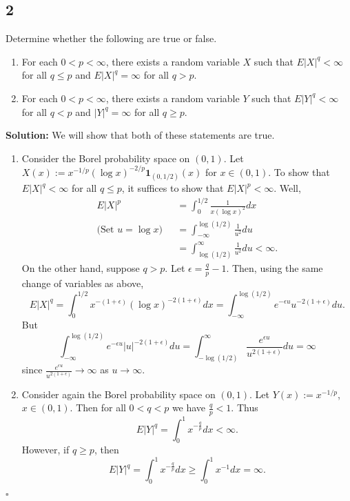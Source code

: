 \documentclass[12pt]{article}
\newcounter{ProofCounter}
\newenvironment{Solution}{\stepcounter{ProofCounter}\textbf{Solution:}}{\hfill$\square$}
\begin{document}
\subsection*{2}
\begin{tcolorbox}
  Determine whether the following are true or false.
  \begin{enumerate}
    \item For each $0 < p < \infty$, there exists a random variable $X$ such that $E|X|^{q} < \infty$ for all $q \leq p$ and $E|X|^{q} = \infty$ for all $q > p$.
    \item For each $0 < p < \infty$, there exists a random variable $Y$ such that $E|Y|^{q} < \infty$ for all $q < p$ and $|Y|^{q} = \infty$ for all $q \geq p$.
  \end{enumerate}
\end{tcolorbox}
\begin{Solution}
  We will show that both of these statements are true.

  \begin{enumerate}
    \item

      Consider the Borel probability space on $(0, 1)$. Let $X(x) := x^{-1/p} (\log x)^{-2/p} \bm{1}_{(0, 1/2)}(x)$ for $x \in (0, 1)$. To show that $E|X|^{q} < \infty$ for all $q \leq p$, it suffices to show that $E|X|^{p} < \infty$. Well,
      \begin{align*}
        E|X|^{p} & = \int_{0}^{1/2} \frac{1}{x(\log x)^2} dx \\
        \text{(Set $u = \log x$)}\ \ \ & = \int_{-\infty}^{\log (1/2)} \frac{1}{u^2} du \\
        & = \int_{\log(1/2)}^{\infty} \frac{1}{u^2} du < \infty.
      \end{align*}
      On the other hand, suppose $q > p$. Let $\epsilon = \frac{q}{p} - 1$. Then, using the same change of variables as above,
      \[
        E|X|^{q} = \int_{0}^{1/2} x^{-(1 + \epsilon)} (\log x)^{-2(1+\epsilon)} dx = \int_{-\infty}^{\log(1/2)} e^{-\epsilon u} u^{-2(1+\epsilon)} du.
      \]
      But
      \[
        \int_{-\infty}^{\log(1/2)} e^{-\epsilon u} |u|^{-2(1+\epsilon)} du = \int_{-\log(1/2)}^{\infty} \frac{e^{\epsilon u}}{u^{2(1 + \epsilon)}} du = \infty
      \]
      since $\frac{e^{\epsilon u}}{u^{2(1 + \epsilon)}} \rightarrow \infty$ as $u \rightarrow \infty$.

    \item

      Consider again the Borel probability space on $(0, 1)$. Let $Y(x) := x^{-1/p}$, $x \in (0, 1)$. Then for all $0 < q < p$ we have $\frac{q}{p} < 1$. Thus
      \[
        E|Y|^{q} = \int_{0}^{1} x^{-\frac{q}{p}}dx < \infty.
      \]
      However, if $q \geq p$, then
      \[
        E|Y|^{q} = \int_{0}^{1} x^{-\frac{q}{p}}dx \geq \int_{0}^{1} x^{-1} dx = \infty.
      \]
  \end{enumerate}
\end{Solution}
\end{document}
